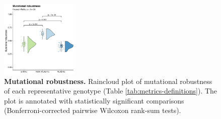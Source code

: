 \begin{figure}[ht!]
    \centering
    \includegraphics[width=0.33\textwidth]{media/mutational-robustness.pdf}
    \caption{\small
        \textbf{Mutational robustness.}
        Raincloud plot of mutational robustness of each representative genotype (Table \ref{tab:metrics-definitions}).
        The plot is annotated with statistically significant comparisons (Bonferroni-corrected pairwise Wilcoxon rank-sum tests).
    }
    \label{fig:mutational-robustness}
\end{figure}